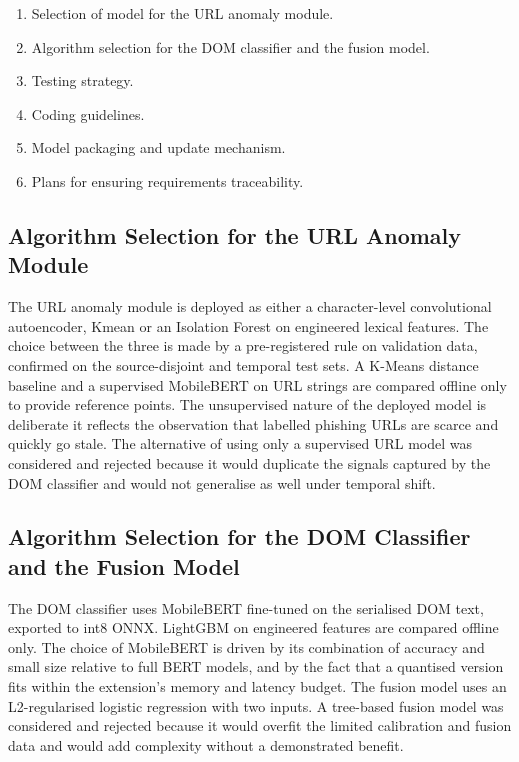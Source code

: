 \documentclass{FastFyp}
\begin{document}
\begin{enumerate}
    \item Selection of model for the URL anomaly module.
    \item Algorithm selection for the DOM classifier and the fusion model.
    \item Testing strategy.
    \item Coding guidelines.
    \item Model packaging and update mechanism.
    \item Plans for ensuring requirements traceability.
\end{enumerate}

\subsection{Algorithm Selection for the URL Anomaly Module}
The URL anomaly module is deployed as either a character-level convolutional autoencoder, Kmean or an Isolation Forest on engineered lexical features. The choice between the three is made by a pre-registered rule on validation data, confirmed on the source-disjoint and temporal test sets. A K-Means distance baseline and a supervised MobileBERT on URL strings are compared offline only to provide reference points. The unsupervised nature of the deployed model is deliberate it reflects the observation that labelled phishing URLs are scarce and quickly go stale. The alternative of using only a supervised URL model was considered and rejected because it would duplicate the signals captured by the DOM classifier and would not generalise as well under temporal shift.

\subsection{Algorithm Selection for the DOM Classifier and the Fusion Model}
The DOM classifier uses MobileBERT fine-tuned on the serialised DOM text, exported to int8 ONNX. LightGBM on engineered features are compared offline only. The choice of MobileBERT is driven by its combination of accuracy and small size relative to full BERT models, and by the fact that a quantised version fits within the extension's memory and latency budget. The fusion model uses an L2-regularised logistic regression with two inputs. A tree-based fusion model was considered and rejected because it would overfit the limited calibration and fusion data and would add complexity without a demonstrated benefit.
\end{document}
